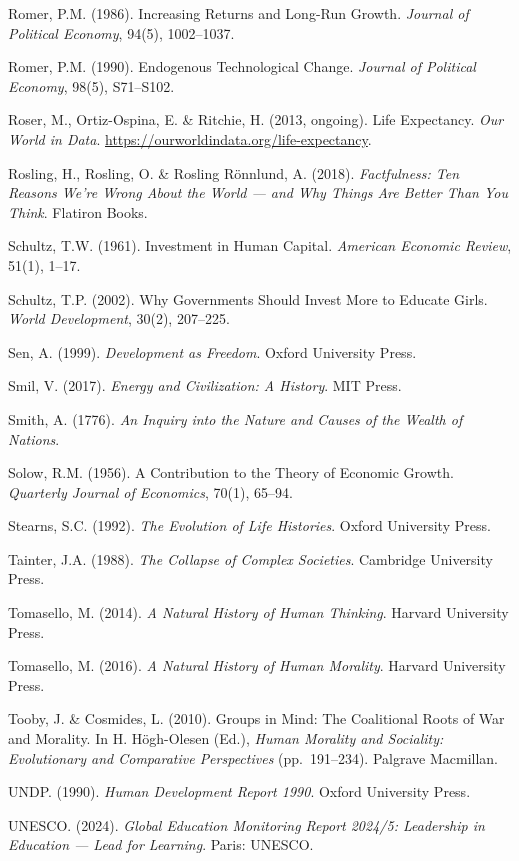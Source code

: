 \documentclass[12pt,letterpaper]{article}
\begin{document}
Romer, P.M. (1986). Increasing Returns and Long-Run Growth.
\emph{Journal of Political Economy}, 94(5), 1002--1037.

Romer, P.M. (1990). Endogenous Technological Change. \emph{Journal of
Political Economy}, 98(5), S71--S102.

Roser, M., Ortiz-Ospina, E. \& Ritchie, H. (2013, ongoing). Life
Expectancy. \emph{Our World in Data}.
\url{https://ourworldindata.org/life-expectancy}.

Rosling, H., Rosling, O. \& Rosling R\"{o}nnlund, A. (2018).
\emph{Factfulness: Ten Reasons We're Wrong About the World --- and
Why Things Are Better Than You Think}. Flatiron Books.

Schultz, T.W. (1961). Investment in Human Capital.
\emph{American Economic Review}, 51(1), 1--17.

Schultz, T.P. (2002). Why Governments Should Invest More to Educate
Girls. \emph{World Development}, 30(2), 207--225.

Sen, A. (1999). \emph{Development as Freedom}. Oxford University Press.

Smil, V. (2017). \emph{Energy and Civilization: A History}. MIT Press.

Smith, A. (1776). \emph{An Inquiry into the Nature and Causes of the
Wealth of Nations}.

Solow, R.M. (1956). A Contribution to the Theory of Economic Growth.
\emph{Quarterly Journal of Economics}, 70(1), 65--94.

Stearns, S.C. (1992). \emph{The Evolution of Life Histories}. Oxford
University Press.

Tainter, J.A. (1988). \emph{The Collapse of Complex Societies}.
Cambridge University Press.

Tomasello, M. (2014). \emph{A Natural History of Human Thinking}.
Harvard University Press.

Tomasello, M. (2016). \emph{A Natural History of Human Morality}.
Harvard University Press.

Tooby, J. \& Cosmides, L. (2010). Groups in Mind: The Coalitional Roots
of War and Morality. In H. H\"{o}gh-Olesen (Ed.), \emph{Human Morality
and Sociality: Evolutionary and Comparative Perspectives} (pp.~191--234).
Palgrave Macmillan.

UNDP. (1990). \emph{Human Development Report 1990}. Oxford University
Press.

UNESCO. (2024). \emph{Global Education Monitoring Report 2024/5:
Leadership in Education --- Lead for Learning}. Paris: UNESCO.
\end{document}
